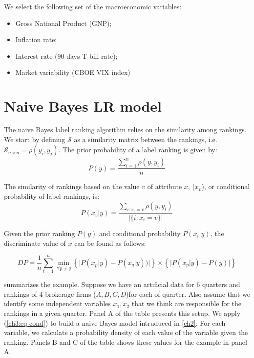 We select the following set of the macroeconomic variables:
\begin{itemize}
\item Gross National Product (GNP);
\item Inflation rate;
\item Interest rate (90-days T-bill rate);
\item Market variability (CBOE VIX index)
\end{itemize}


\section{Naive Bayes LR model}
\label{ch3-sec:labelranking}


The naive Bayes label ranking algorithm relies on the similarity  among rankings. We start by defining $\mathcal{S}$ as a similarity matrix between the rankings, i.e. $\mathcal{S}_{n \times n}=\rho(y_i,y_j)$. The prior probability of a label ranking is given by:
\begin{equation}
P(y) = \frac{\sum_{i=1}^{n} \rho(y,y_i)}{n}
\end{equation}

The similarity of rankings based on the value $v$ of attribute $x$, ($x_{v}$),  or conditional probability of label rankings, is:
\begin{equation}
\label{ch3:eq-cond}
P(x_{v}|y)= \frac{\sum_{i: x_{i} = v}\rho(y, y_i)}{|\{i: x_{i} = v\}|}
\end{equation}


Given the prior ranking $P(y)$ and conditional probability $P(x_i|y)$, the discriminate value of $x$ can be found as follows:

\begin{equation}
\label{ch3:eq-dp}
DP=\frac{1}{n}\sum_{t=1}^n \min_{\forall p \neq q} \left\{\lvert P(x_p|y) - P(x_q|y) )\rvert \right\} \times \left\{\lvert P(x_p|y)-P(y)\rvert\right\}
\end{equation}

 summarizes the example. Suppose we have  an artificial data for 6 quarters and rankings of 4 brokerage firms ($A,B,C,D$)for each of  quarter. Also assume that we identify some independent variables $x_1, x_2$ that we think are responsible for the rankings in a given quarter. Panel A of the table presents this setup. We  apply (\vref*{ch3:eq-cond}) to build a naive Bayes model intruduced in \vref{ch2}. For each variable, we calculate a probability density of each value of the variable given the ranking. Panels B and C of the table shows these values for the example in panel A.

